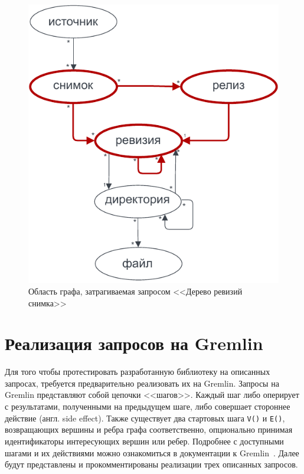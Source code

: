 \documentclass[times,specification,annotation]{itmo-student-thesis}
\begin{document}
\begin{figure}[!h]
\caption{Область графа, затрагиваемая запросом <<Дерево ревизий снимка>>}\label{snp-graph}
\centering
\includegraphics{img/snp-graph.pdf}
\end{figure}

\section{Реализация запросов на Gremlin}

Для того чтобы протестировать разработанную библиотеку на описанных запросах, требуется предварительно реализовать их на Gremlin. Запросы на Gremlin представляют собой цепочки <<шагов>>. Каждый шаг либо оперирует с результатами, полученными на предыдущем шаге, либо совершает стороннее действие (англ. side effect). Также существует два стартовых шага \texttt{V()} и \texttt{E()}, возвращающих вершины и ребра графа соответственно, опционально принимая идентификаторы интересующих вершин или ребер. Подробнее с доступными шагами и их действиями можно ознакомиться в документации к Gremlin~\cite{gremlin-steps}. Далее будут представлены и прокомментированы реализации трех описанных запросов.
\end{document}
